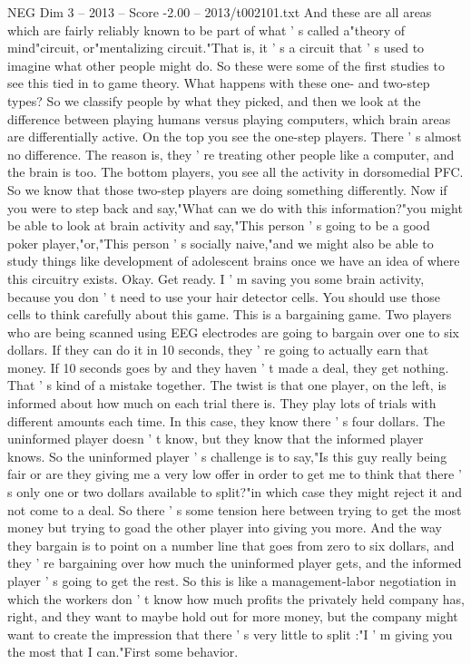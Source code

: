 \begin{textsample}{NEG Dim 3 – 2013 – Score -2.00 – 2013/t002101.txt}
And these are all areas which are fairly reliably known to be part of what ' s called a"theory of mind"circuit, or"mentalizing circuit."That is, it ' s a circuit that ' s used to imagine what other people might do.
So these were some of the first studies to see this tied in to game theory.
What happens with these one- and two-step types?
So we classify people by what they picked, and then we look at the difference between playing humans versus playing computers, which brain areas are differentially active.
On the top you see the one-step players.
There ' s almost no difference.
The reason is, they ' re treating other people like a computer, and the brain is too.
The bottom players, you see all the activity in dorsomedial PFC.
So we know that those two-step players are doing something differently.
Now if you were to step back and say,"What can we do with this information?"you might be able to look at brain activity and say,"This person ' s going to be a good poker player,"or,"This person ' s socially naive,"and we might also be able to study things like development of adolescent brains once we have an idea of where this circuitry exists.
Okay.
Get ready.
I ' m saving you some brain activity, because you don ' t need to use your hair detector cells.
You should use those cells to think carefully about this game.
This is a bargaining game.
Two players who are being scanned using EEG electrodes are going to bargain over one to six dollars.
If they can do it in 10 seconds, they ' re going to actually earn that money.
If 10 seconds goes by and they haven ' t made a deal, they get nothing.
That ' s kind of a mistake together.
The twist is that one player, on the left, is informed about how much on each trial there is.
They play lots of trials with different amounts each time.
In this case, they know there ' s four dollars.
The uninformed player doesn ' t know, but they know that the informed player knows.
So the uninformed player ' s challenge is to say,"Is this guy really being fair or are they giving me a very low offer in order to get me to think that there ' s only one or two dollars available to split?"in which case they might reject it and not come to a deal.
So there ' s some tension here between trying to get the most money but trying to goad the other player into giving you more.
And the way they bargain is to point on a number line that goes from zero to six dollars, and they ' re bargaining over how much the uninformed player gets, and the informed player ' s going to get the rest.
So this is like a management-labor negotiation in which the workers don ' t know how much profits the privately held company has, right, and they want to maybe hold out for more money, but the company might want to create the impression that there ' s very little to split :"I ' m giving you the most that I can."First some behavior.

\end{textsample}
